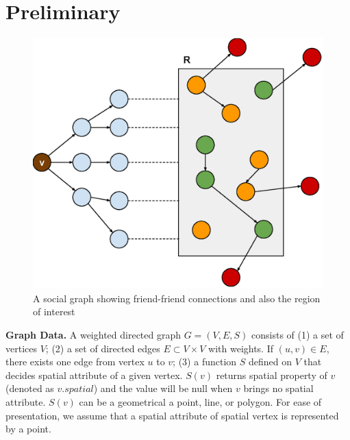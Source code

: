 \section{Preliminary}
\label{sec:preliminary}

\begin{figure}[h]
	\centering
	\includegraphics[width=0.88\linewidth]{images/image10.eps}
	\caption{A social graph showing friend-friend connections and also the region of interest}
	\label{fig:socio-spatial-graph}
\end{figure}

{\bf Graph Data.} A weighted directed graph $G=(V,E,S)$ consists of (1) a set of vertices $V$; (2) a set of directed edges $E\subset V\times V$ with weights. If $(u,v)\in E$, there exists one edge from vertex $u$ to $v$; (3) a function $S$ defined on $V$ that decides spatial attribute of a given vertex. $S(v)$ returns spatial property of $v$ (denoted as $v.spatial$) and the value will be null when $v$ brings no spatial attribute. $S(v)$ can be a geometrical a point, line, or polygon. For ease of presentation, we assume that a spatial attribute of spatial vertex is represented by a point.

